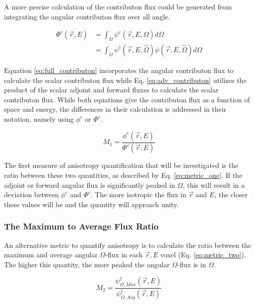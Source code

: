 A more precise calculation of the contributon flux could be generated from
integrating the angular contributon flux over all angle.

\begin{equation}
  \begin{split}
    \Phi^{c}(\vec {r} ,E)  & = \int_{\Omega}{\psi^{c}(\vec{r}, E,\Omega)}
                               d\Omega \\
             & = \int_{\Omega}{\psi^{\dagger}(\vec{r}, E, \hat\Omega)
                 \psi(\vec{r}, E, \hat\Omega)} d\Omega
  \end{split}
\label{eq:full_contributon}
\end{equation}

Equation \ref{eq:full_contributon} incorporates the angular contributon flux
to calculate the scalar contributon flux
while Eq. \ref{eq:adv_contributon} utilizes the product of the scalar
adjoint and forward fluxes to calculate the scalar contributon flux. While both
equations give the contributon flux as a function of space and energy, the
differences in their calculation is addressed in their notation, namely using
$\phi^{c}$ or $\Phi^{c}$.

\begin{equation}
  M_{1} = \frac{\phi^{c}(\vec {r} ,E)}{\Phi^{c}(\vec {r} ,E)}
  \label{eq:metric_one}
\end{equation}

The first measure of anisotropy quantification that will be investigated is the
ratio between these two quantities, as described by Eq. \ref{eq:metric_one}.
If the adjoint or forward angular flux is significantly
peaked in $\Omega$, this will result in a deviation between $\phi^{c}$ and
$\Phi^{c}$. The more isotropic the flux in $\vec{r}$ and $E$, the closer these
values will be and the quantity will approach unity.

\subsubsection{The Maximum to Average Flux Ratio}

An alternative metric to quantify anisotropy is to calculate the ratio between
the maximum and average angular $\Omega$-flux in each $\vec{r} , E$ voxel (Eq.
\ref{eq:metric_two}).
The higher this quantity, the more peaked the angular $\Omega$-flux is in $\Omega$.

\begin{equation}
  M_{2} = \frac{\psi_{\Omega, Max}^{\dagger}(\vec {r} ,E)}{\psi_{\Omega,
                 Avg}^{\dagger}(\vec {r} ,E)}
  \label{eq:metric_two}
\end{equation}

